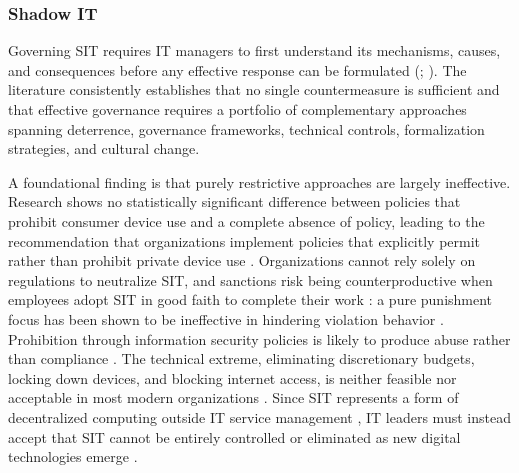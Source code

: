 \documentclass[12pt,oneside]{article}
\begin{document}
\subsubsection{Shadow IT}

Governing \ac{SIT} requires \ac{IT} managers to first understand its mechanisms, causes, and consequences before any effective response can be formulated (\citealp[469]{haag2017shadow}; \citealp[6467]{mallmann2019social}). The literature consistently establishes that no single countermeasure is sufficient and that effective governance requires a portfolio of complementary approaches spanning deterrence, governance frameworks, technical controls, formalization strategies, and cultural change.

A foundational finding is that purely restrictive approaches are largely ineffective. Research shows no statistically significant difference between policies that prohibit consumer device use and a complete absence of policy, leading to the recommendation that organizations implement policies that explicitly permit rather than prohibit private device use \citep[856]{klesel2019employees}. Organizations cannot rely solely on regulations to neutralize \ac{SIT}, and sanctions risk being counterproductive when employees adopt \ac{SIT} in good faith to complete their work \citep[1171]{trialih2023challenge}: a pure punishment focus has been shown to be ineffective in hindering violation behavior \citep[511]{nguyen2024understanding}. Prohibition through information security policies is likely to produce abuse rather than compliance \citep[2]{welck2017empowerment}. The technical extreme, eliminating discretionary budgets, locking down devices, and blocking internet access, is neither feasible nor acceptable in most modern organizations \citep[11]{chua2014central}. Since \ac{SIT} represents a form of decentralized computing outside \ac{IT} service management \citep[428]{mallmann2021mediating}, \ac{IT} leaders must instead accept that \ac{SIT} cannot be entirely controlled or eliminated as new digital technologies emerge \citep[408]{haag2024dealing}.
\end{document}
